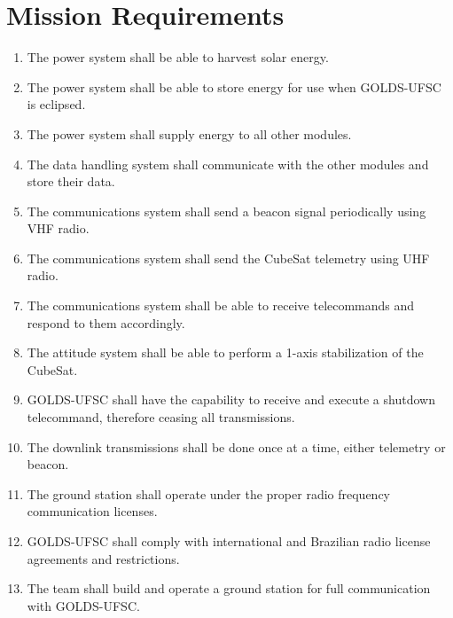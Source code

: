 %
%
%
%
%

%
%
%
%
%
%

\chapter{Mission Requirements} \label{ch:requirements}

\begin{enumerate}
    \item The power system shall be able to harvest solar energy.
    \item The power system shall be able to store energy for use when GOLDS-UFSC is eclipsed.
    \item The power system shall supply energy to all other modules.
    \item The data handling system shall communicate with the other modules and store their data.
    \item The communications system shall send a beacon signal periodically using VHF radio.
    \item The communications system shall send the CubeSat telemetry using UHF radio.
    \item The communications system shall be able to receive telecommands and respond to them accordingly.
    \item The attitude system shall be able to perform a 1-axis stabilization of the CubeSat.
    \item GOLDS-UFSC shall have the capability to receive and execute a shutdown telecommand, therefore ceasing all transmissions.
    \item The downlink transmissions shall be done once at a time, either telemetry or beacon.
    \item The ground station shall operate under the proper radio frequency communication licenses.
    \item GOLDS-UFSC shall comply with international and Brazilian radio license agreements and restrictions.
    \item The team shall build and operate a ground station for full communication with GOLDS-UFSC.
\end{enumerate}
